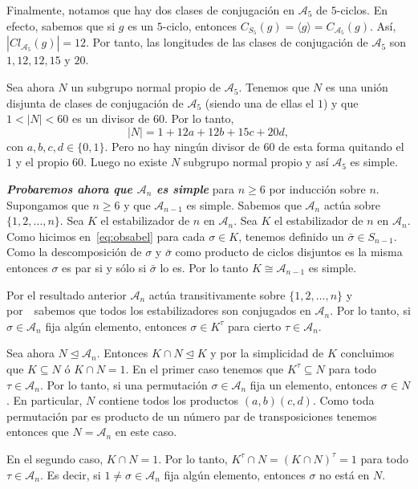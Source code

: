 \documentclass[12pt]{article}
\begin{document}
Finalmente, notamos que hay dos clases de conjugación en $\mathcal{A}_{5}$ de $5$-ciclos. En efecto, sabemos que si $g$ es un $5$-ciclo, entonces $C_{S_{5}}(g) = \langle g \rangle = C_{\mathcal{A}_{5}}(g)$. Así, $|Cl_{\mathcal{A}_{5}}(g)| = 12$. Por tanto, las longitudes de las clases de conjugación de $\mathcal{A}_{5}$ son $1,12,12,15$ y $20$.

Sea ahora $N$ un subgrupo normal propio de $\mathcal{A}_{5}$. Tenemos que $N$ es una unión disjunta de clases de conjugación de $\mathcal{A}_{5}$ (siendo una de ellas el $1$) y que $1 < |N| < 60$ es un divisor de $60$. Por lo tanto, $$|N| = 1 + 12a + 12b + 15c + 20d,$$ con $a,b,c,d \in \lbrace 0, 1 \rbrace$. Pero no hay ningún divisor de $60$ de esta forma quitando el $1$ y el propio $60$. Luego no existe $N$ subgrupo normal propio y así $\mathcal{A}_{5}$ es simple.

\textbf{\textit{Probaremos ahora que $\mathcal{A}_{n}$ es simple}} para $n \geq 6$ por inducción sobre $n$. Supongamos que $n \geq 6$ y que $\mathcal{A}_{n-1}$ es simple. Sabemos que $\mathcal{A}_{n}$ actúa sobre $\lbrace 1,2, \ldots, n \rbrace$. Sea $K$ el estabilizador de $n$ en $\mathcal{A}_{n}$. Sea $K$ el estabilizador de $n$ en $\mathcal{A}_{n}$. Como hicimos en~\ref{eq:obsabel} para cada $\sigma \in K$, tenemos definido un $\bar{\sigma} \in S_{n-1}$. Como la descomposición de $\sigma$ y $\bar{\sigma}$ como producto de ciclos disjuntos es la misma entonces $\sigma$ es par si y sólo si $\bar{\sigma}$ lo es. Por lo tanto $K \cong \mathcal{A}_{n-1}$ es simple.

Por el resultado anterior $\mathcal{A}_{n}$ actúa transitivamente sobre $\lbrace 1, 2, \ldots, n \rbrace$ y por~~sabemos que todos los estabilizadores son conjugados en $\mathcal{A}_{n}$. Por lo tanto, si $\sigma \in \mathcal{A}_{n}$ fija algún elemento, entonces $\sigma \in K^{\tau}$ para cierto $\tau \in \mathcal{A}_{n}$.

Sea ahora $N\unlhd \mathcal{A}_{n}$. Entonces $K \cap N \unlhd K$ y por la simplicidad de $K$ concluimos que $K \subseteq N$ ó $K \cap N = 1$. En el primer caso tenemos que $K^{\tau} \subseteq N$ para todo $\tau \in \mathcal{A}_{n}$. Por lo tanto, si una permutación $\sigma \in \mathcal{A}_{n}$ fija un elemento, entonces $\sigma \in N$. En particular, $N$ contiene todos los productos $(a,b)(c,d)$. Como toda permutación par es producto de un número par de transposiciones tenemos entonces que $N = \mathcal{A}_{n}$ en este caso.

En el segundo caso, $K \cap N = 1$. Por lo tanto, $K^{\tau} \cap N = (K \cap N)^{\tau} = 1$ para todo $\tau \in \mathcal{A}_{n}$. Es decir, si $1 \neq \sigma \in \mathcal{A}_{n}$ fija algún elemento, entonces $\sigma$ no está en $N$. 
\end{document}
